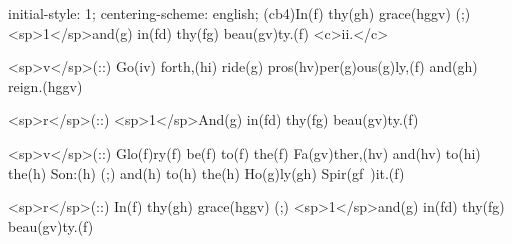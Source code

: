initial-style: 1;
centering-scheme: english;
(cb4)In(f) thy(gh) grace(hggv) (;) <sp>1</sp>and(g) in(fd) thy(fg) beau(gv)ty.(f) <c>ii.</c>

<sp>v</sp>(::) Go(iv) forth,(hi) ride(g) pros(hv)per(g)ous(g)ly,(f) and(gh) reign.(hggv)

<sp>r</sp>(::) <sp>1</sp>And(g) in(fd) thy(fg) beau(gv)ty.(f) 

<sp>v</sp>(::) Glo(f)ry(f) be(f) to(f) the(f) Fa(gv)ther,(hv) and(hv) to(hi) the(h) Son:(h) (;) and(h) to(h) the(h) Ho(g)ly(gh) Spir(gf~)it.(f)

<sp>r</sp>(::) In(f) thy(gh) grace(hggv) (;) <sp>1</sp>and(g) in(fd) thy(fg) beau(gv)ty.(f) 